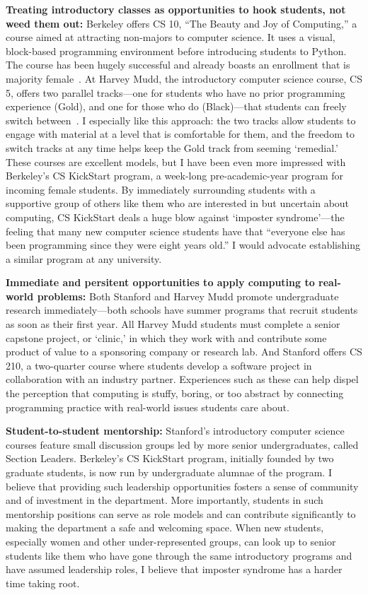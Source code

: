 \documentclass[
10pt, %
a4paper, %
oneside, %
headinclude,footinclude, %
BCOR5mm, %
]{scrartcl}
\begin{document}
\textbf{Treating introductory classes as opportunities to hook students, not weed them out:}
Berkeley offers CS 10, ``The Beauty and Joy of Computing,'' a course aimed at attracting non-majors to computer science. It uses a visual, block-based programming environment before introducing students to Python. The course has been hugely successful and already boasts an enrollment that is majority female~\cite{CS10}. At Harvey Mudd, the introductory computer science course, CS 5, offers two parallel tracks---one for students who have no prior programming experience (Gold), and one for those who do (Black)---that students can freely switch between~\cite{CS5}. I especially like this approach: the two tracks allow students to engage with material at a level that is comfortable for them, and the freedom to switch tracks at any time helps keep the Gold track from seeming `remedial.' These courses are excellent models, but I have been even more impressed with Berkeley's CS KickStart program, a week-long pre-academic-year program for incoming female students. By immediately surrounding students with a supportive group of others like them who are interested in but uncertain about computing, CS KickStart deals a huge blow against `imposter syndrome'---the feeling that many new computer science students have that ``everyone else has been programming since they were eight years old.'' I would advocate establishing a similar program at any university.

\textbf{Immediate and persitent opportunities to apply computing to real-world problems:}
Both Stanford and Harvey Mudd promote undergraduate research immediately---both schools have summer programs that recruit students as soon as their first year.
All Harvey Mudd students must complete a senior capstone project, or `clinic,' in which they work with and contribute some product of value to a sponsoring company or research lab. And Stanford offers CS 210, a two-quarter course where students develop a software project in collaboration with an industry partner. Experiences such as these can help dispel the perception that computing is stuffy, boring, or too abstract by connecting programming practice with real-world issues students care about.

\textbf{Student-to-student mentorship:}
Stanford's introductory computer science courses feature small discussion groups led by more senior undergraduates, called Section Leaders. Berkeley's CS KickStart program, initially founded by two graduate students, is now run by undergraduate alumnae of the program. I believe that providing such leadership opportunities fosters a sense of community and of investment in the department. More importantly, students in such mentorship positions can serve as role models and can contribute significantly to making the department a safe and welcoming space. When new students, especially women and other under-represented groups, can look up to senior students like them who have gone through the same introductory programs and have assumed leadership roles, I believe that imposter syndrome has a harder time taking root.
\end{document}
